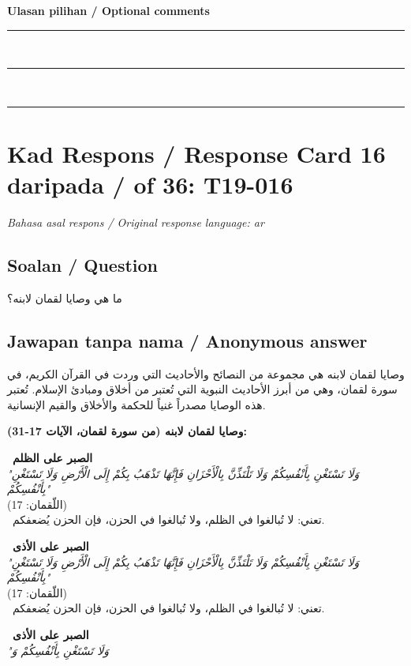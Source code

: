 \documentclass[11pt,a4paper]{article}
\newcommand{\ar}[1]{{\arabicfont #1}}
\begin{document}
\medskip
\textbf{Ulasan pilihan / Optional comments}\\[3pt]
\rule{\textwidth}{0.4pt}\\[16pt]
\rule{\textwidth}{0.4pt}\\[16pt]
\rule{\textwidth}{0.4pt}

\newpage
\section*{Kad Respons / Response Card 16 daripada / of 36: T19-016}
\textit{Bahasa asal respons / Original response language: ar}

\subsection*{Soalan / Question}
\ar{ما} \ar{هي} \ar{وصايا} \ar{لقمان} \ar{لابنه؟}

\subsection*{Jawapan tanpa nama / Anonymous answer}
\ar{وصايا} \ar{لقمان} \ar{لابنه} \ar{هي} \ar{مجموعة} \ar{من} \ar{النصائح} \ar{والأحاديث} \ar{التي} \ar{وردت} \ar{في} \ar{القرآن} \ar{الكريم،} \ar{في} \ar{سورة} \ar{لقمان،} \ar{وهي} \ar{من} \ar{أبرز} \ar{الأحاديث} \ar{النبوية} \ar{التي} \ar{تُعتبر} \ar{من} \ar{أخلاق} \ar{ومبادئ} \ar{الإسلام}. \ar{تُعتبر} \ar{هذه} \ar{الوصايا} \ar{مصدراً} \ar{غنياً} \ar{للحكمة} \ar{والأخلاق} \ar{والقيم} \ar{الإنسانية}.\par\medskip \textbf{\ar{وصايا} \ar{لقمان} \ar{لابنه} (\ar{من} \ar{سورة} \ar{لقمان،} \ar{الآيات} 17-31):}\par\medskip \textbullet\ \textbf{\ar{الصبر} \ar{على} \ar{الظلم}}\\ \emph{"\ar{وَلَا} \ar{تَسْتَغْنِ} \ar{بِأَنْفُسِكُمْ} \ar{وَلَا} \ar{تَلْتَذِّنَّ} \ar{بِالْأَحْزَانِ} \ar{فَإِنَّهَا} \ar{تَذْهَبُ} \ar{بِكُمْ} \ar{إِلَى} \ar{الْأَرْضِ} \ar{وَلَا} \ar{تَسْتَغْنِ} \ar{بِأَنْفُسِكُمْ}"}\\ (\ar{اللّقمان}: 17)\\ \textbullet\ \ar{تعني}: \ar{لا} \ar{تُبالغوا} \ar{في} \ar{الظلم،} \ar{ولا} \ar{تُبالغوا} \ar{في} \ar{الحزن،} \ar{فإن} \ar{الحزن} \ar{يُضعفكم}.\par\medskip \textbullet\ \textbf{\ar{الصبر} \ar{على} \ar{الأذى}}\\ \emph{"\ar{وَلَا} \ar{تَسْتَغْنِ} \ar{بِأَنْفُسِكُمْ} \ar{وَلَا} \ar{تَلْتَذِّنَّ} \ar{بِالْأَحْزَانِ} \ar{فَإِنَّهَا} \ar{تَذْهَبُ} \ar{بِكُمْ} \ar{إِلَى} \ar{الْأَرْضِ} \ar{وَلَا} \ar{تَسْتَغْنِ} \ar{بِأَنْفُسِكُمْ}"}\\ (\ar{اللّقمان}: 17)\\ \textbullet\ \ar{تعني}: \ar{لا} \ar{تُبالغوا} \ar{في} \ar{الظلم،} \ar{ولا} \ar{تُبالغوا} \ar{في} \ar{الحزن،} \ar{فإن} \ar{الحزن} \ar{يُضعفكم}.\par\medskip \textbullet\ \textbf{\ar{الصبر} \ar{على} \ar{الأذى}}\\ \emph{"\ar{وَلَا} \ar{تَسْتَغْنِ} \ar{بِأَنْفُسِكُمْ} \ar{وَ}}
\end{document}
